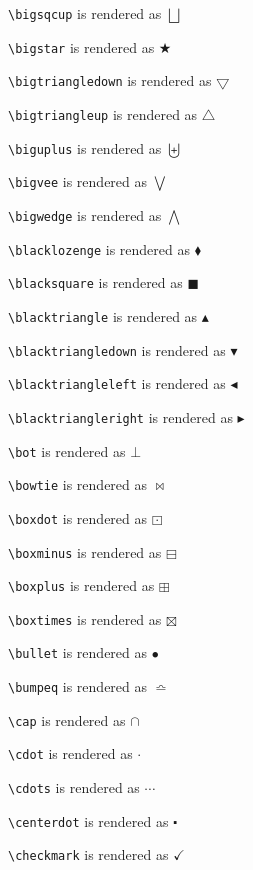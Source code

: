 \texttt{\textbackslash bigsqcup} is rendered as $\bigsqcup$

\texttt{\textbackslash bigstar} is rendered as $\bigstar$

\texttt{\textbackslash bigtriangledown} is rendered as $\bigtriangledown$

\texttt{\textbackslash bigtriangleup} is rendered as $\bigtriangleup$

\texttt{\textbackslash biguplus} is rendered as $\biguplus$

\texttt{\textbackslash bigvee} is rendered as $\bigvee$

\texttt{\textbackslash bigwedge} is rendered as $\bigwedge$

\texttt{\textbackslash blacklozenge} is rendered as $\blacklozenge$

\texttt{\textbackslash blacksquare} is rendered as $\blacksquare$

\texttt{\textbackslash blacktriangle} is rendered as $\blacktriangle$

\texttt{\textbackslash blacktriangledown} is rendered as $\blacktriangledown$

\texttt{\textbackslash blacktriangleleft} is rendered as $\blacktriangleleft$

\texttt{\textbackslash blacktriangleright} is rendered as $\blacktriangleright$

\texttt{\textbackslash bot} is rendered as $\bot$

\texttt{\textbackslash bowtie} is rendered as $\bowtie$

\texttt{\textbackslash boxdot} is rendered as $\boxdot$

\texttt{\textbackslash boxminus} is rendered as $\boxminus$

\texttt{\textbackslash boxplus} is rendered as $\boxplus$

\texttt{\textbackslash boxtimes} is rendered as $\boxtimes$

\texttt{\textbackslash bullet} is rendered as $\bullet$

\texttt{\textbackslash bumpeq} is rendered as $\bumpeq$

\texttt{\textbackslash cap} is rendered as $\cap$

\texttt{\textbackslash cdot} is rendered as $\cdot$

\texttt{\textbackslash cdots} is rendered as $\cdots$

\texttt{\textbackslash centerdot} is rendered as $\centerdot$

\texttt{\textbackslash checkmark} is rendered as $\checkmark$

